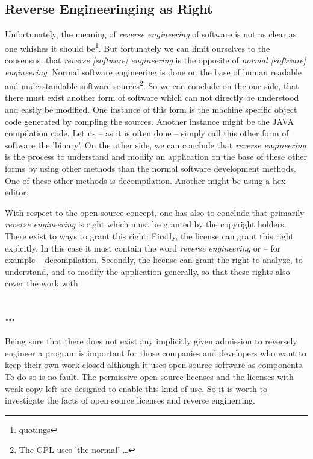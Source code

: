 \subsection{Reverse Engineeringing as Right}

Unfortunately, the meaning of \emph{reverse engineering} of software is not as
clear as one whishes it should be\footnote{quotings}. But fortunately we can
limit ourselves to the consensus, that \emph{reverse [software] engineering} is
the opposite of \emph{normal [software] engineering}: Normal software
engineering is done on the base of human readable and understandable software
sources\footnote{The GPL uses 'the normal' \ldots}. So we can conclude on the
one side, that there must exist another form of software which can not directly be
understood and easily be modified. One instance of this form is the machine
specific object code generated by compling the sources. Another instance might
be the JAVA compilation code. Let us -- as it is often done -- simply call this
other form of software the 'binary'. On the other side, we can conclude that
\emph{reverse engineering} is the process to understand and modify an application on the base of these other forms by using other methods than the normal software development
methods. One of these other methods is decompilation. Another might be using a
hex editor.

With respect to the open source concept, one has also to conclude that primarily
\emph{reverse engineering} is right which must be granted by the copyright
holders. There exist to ways to grant this right: Firstly, the license can grant
this right explcitly. In this case it must contain the word \emph{reverse
engineering} or -- for example -- decompilation. Secondly, the license can grant
the right to analyze, to understand, and to modify the application generally, so
that these rights also cover the work with

\subsection{\ldots}

Being sure that there does not exist any implicitly given admission to reversely
engineer a program is important for those companies and developers who want to
keep their own work closed although it uses open source software as components.
To do so is no fault. The permissive open source licenses and the licenses with
weak copy left are designed to enable this kind of use. So it is worth to
investigate the facts of open source licenses and reverse enginerring.



